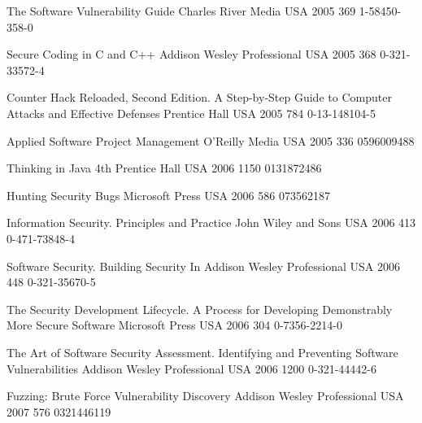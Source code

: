 \begin{thebibliography}{9}
		{
			\BibAnd
			}
		{The Software Vulnerability Guide}
		{}
		{Charles River Media}
		{USA}
		{2005}
		{369}
		{1-58450-358-0}
	
		{}
		{Secure Coding in {C} and {C++}}
		{}
		{Addison Wesley Professional}
		{USA}
		{2005}
		{368}
		{0-321-33572-4}
	
		{
			\BibAnd
			}
		{Counter Hack Reloaded, Second Edition. A Step-by-Step Guide to Computer Attacks and Effective Defenses}
		{}
		{Prentice Hall}
		{USA}
		{2005}
		{784}
		{0-13-148104-5}

		{
			\BibAnd
			}
		{Applied Software Project Management}
		{}
		{O'Reilly Media}
		{USA}
		{2005}
		{336}
		{0596009488}

		{}
		{Thinking in Java}
		{4th}
		{Prentice Hall}
		{USA}
		{2006}
		{1150}
		{0131872486}
	
		{
			\BibAnd
			\BibAnd
			}
		{Hunting Security Bugs}
		{}
		{Microsoft Press}
		{USA}
		{2006}
		{586}
		{073562187}
	
		{}
		{Information Security. Principles and Practice}
		{}
		{John Wiley and Sons}
		{USA}
		{2006}
		{413}
		{0-471-73848-4}
	
		{}
		{Software Security. Building Security In}
		{}
		{Addison Wesley Professional}
		{USA}
		{2006}
		{448}
		{0-321-35670-5}
	
		{
			\BibAnd
			}
		{The Security Development Lifecycle. A Process for Developing Demonstrably More Secure Software}
		{}
		{Microsoft Press}
		{USA}
		{2006}
		{304}
		{0-7356-2214-0}
	
		{
			\BibAnd
			\BibAnd
			}
		{The Art of Software Security Assessment. Identifying and Preventing Software Vulnerabilities}
		{}
		{Addison Wesley Professional}
		{USA}
		{2006}
		{1200}
		{0-321-44442-6}
	
		{
			\BibAnd
			\BibAnd
			}
		{Fuzzing: Brute Force Vulnerability Discovery}
		{}
		{Addison Wesley Professional}
		{USA}
		{2007}
		{576}
		{0321446119}
	

\end{thebibliography}
